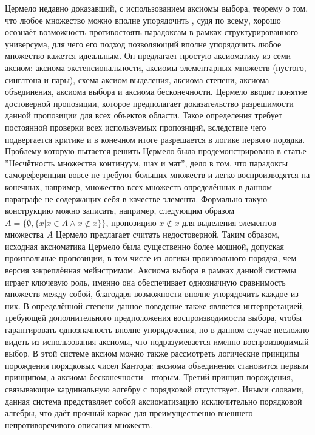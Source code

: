 \documentclass[12pt]{article}
\begin{document}
Цермело недавно доказавший, с использованием аксиомы выбора, теорему о том, что любое множество можно вполне упорядочить \cite{zermelo-well-order}, судя по всему, хорошо осознаёт возможность противостоять парадоксам в рамках структурированного универсума, для чего его подход позволяющий вполне упорядочить любое множество кажется идеальным. Он предлагает простую аксиоматику из семи аксиом: аксиома экстенсиональности, аксиомы элементарных множеств (пустого, синглтона и пары), схема аксиом выделения, аксиома степени, аксиома объединения, аксиома выбора и аксиома бесконечности. Цермело вводит понятие достоверной пропозиции, которое предполагает доказательство разрешимости данной пропозиции для всех объектов области. Такое определения требует постоянной проверки всех используемых пропозиций, вследствие чего подвергается критике и в конечном итоге разрешается в логике первого порядка. Проблему которую пытается решить Цермело была продемонстрирована в статье ''Несчётность множества континуум, шах и мат'', дело в том, что парадоксы самореференции вовсе не требуют больших множеств и легко воспроизводятся на конечных, например, множество всех множеств определённых в данном параграфе не содержащих себя в качестве элемента. Формально такую конструкцию можно записать, например, следующим образом $A = \{ \emptyset, \{ x | x \in A \wedge x \notin x \} \}$, пропозицию $x \notin x$ для выделения элементов множества $A$ Цермело предлагает считать недостоверной. Таким образом, исходная аксиоматика Цермело была существенно более мощной, допуская произвольные пропозиции, в том числе из логики произвольного порядка, чем версия закреплённая мейнстримом. Аксиома выбора в рамках данной системы играет ключевую роль, именно она обеспечивает однозначную сравнимость множеств между собой, благодаря возможности вполне упорядочить каждое из них. В определённой степени данное поведение также является интерпретацией, требующей дополнительного предположения воспроизводимости выбора, чтобы гарантировать однозначность вполне упорядочения, но в данном случае несложно видеть из использования аксиомы, что подразумевается именно воспроизводимый выбор. В этой системе аксиом можно также рассмотреть логические принципы порождения порядковых чисел Кантора: аксиома объединения становится первым принципом, а аксиома бесконечности - вторым. Третий принцип порождения, связывающие кардинальную алгебру с порядковой отсутствует. Иными словами, данная система представляет собой аксиоматизацию исключительно порядковой алгебры, что даёт прочный каркас для преимущественно внешнего непротиворечивого описания множеств. 
\end{document}
